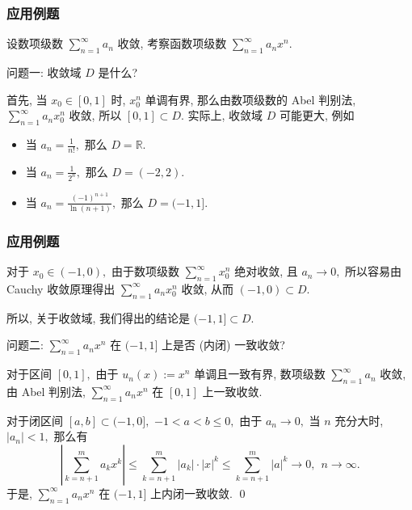 
\begin{frame}
\frametitle{应用例题}

\begin{eg}
设数项级数 $\sum_{n=1}^\infty a_n$ 收敛, 考察函数项级数 $\displaystyle \sum_{n=1}^\infty a_n x^n.$
\end{eg}

\vspace{0.5em}

{\color{red}} 问题一: 收敛域 $D$ 是什么?

\pause

首先, 当 $x_0 \in [0, 1]$ 时, $x_0^n$ 单调有界, 那么由数项级数的 Abel 判别法, $\displaystyle \sum_{n=1}^\infty a_n x_0^n$ 收敛, 所以 $[0, 1] \subset D.$
\pause
实际上, 收敛域 $D$ 可能更大, 例如
\begin{itemize}
\item 当 $a_n = \frac{1}{n!},$ 那么 $D = \mathbb{R}.$
\item 当 $a_n = \frac{1}{2^n},$ 那么 $D = (-2, 2).$
\item 当 $a_n = \frac{(-1)^{n+1}}{\ln(n+1)},$ 那么 $D = (-1, 1].$
\end{itemize}

\end{frame}


\begin{frame}
\frametitle{应用例题}

对于 $x_0 \in (-1, 0),$ 由于数项级数 $\sum_{n=1}^\infty x_0^n$ 绝对收敛, 且 $a_n \to 0,$ 所以容易由 Cauchy 收敛原理得出 $\displaystyle \sum_{n=1}^\infty a_n x_0^n$ 收敛, 从而 $(-1, 0) \subset D.$

\pause

所以, 关于收敛域, 我们得出的结论是 $(-1, 1] \subset D.$

\vspace{0.5em}

{\color{red}} 问题二: $\displaystyle \sum_{n=1}^\infty a_n x^n$ 在 $(-1, 1]$ 上是否 (内闭) 一致收敛?

\pause

对于区间 $[0, 1],$ 由于 $u_n(x) := x^n$ 单调且一致有界, 数项级数 $\displaystyle \sum_{n=1}^\infty a_n$ 收敛, 由 Abel 判别法, $\displaystyle \sum_{n=1}^\infty a_n x^n$ 在 $[0, 1]$ 上一致收敛.

\pause

对于闭区间 $[a, b] \subset (-1, 0],$ $-1 < a < b \leqslant 0,$ 由于 $a_n \to 0,$ 当 $n$ 充分大时, $|a_n| < 1,$ 那么有
\[
\left| \sum_{k=n+1}^m a_k x^k \right| \leqslant \sum_{k=n+1}^m |a_k| \cdot |x|^k \leqslant \sum_{k=n+1}^m |a|^k \to 0, ~~ n \to \infty.
\]
于是, $\displaystyle \sum_{n=1}^\infty a_n x^n$ 在 $(-1, 1]$ 上\alert{内闭一致收敛}.
\qed

\end{frame}

